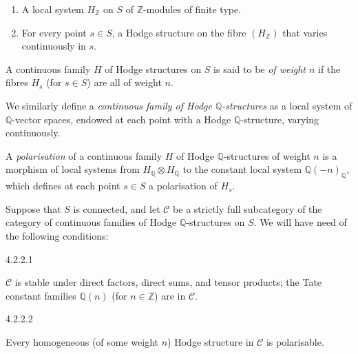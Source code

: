     
 \begin{enumerate}
      
 \item[(a)]
        A local system \(H_\mathbb {Z}\) on \(S\) of \(\mathbb {Z}\)-modules of finite type.
      

      
 \item[(b)]
        For every point \(s\in  S\), a Hodge structure on the fibre \((H_\mathbb {Z})\) that varies continuously in \(s\).
      

    \end{enumerate}\par{}A continuous family \(H\) of Hodge structures on \(S\) is said to be \emph{of weight \(n\)} if the fibres \(H_s\) (for \(s\in  S\)) are all of weight \(n\).\par{}We similarly define a \emph{continuous family of Hodge \(\mathbb {Q}\)-structures} as a local system of \(\mathbb {Q}\)-vector spaces, endowed at each point with a Hodge \(\mathbb {Q}\)-structure, varying continuously.\par{}A \emph{polarisation} of a continuous family \(H\) of Hodge \(\mathbb {Q}\)-structures of weight \(n\) is a morphism of local systems from \(H_\mathbb {Q}\otimes  H_\mathbb {Q}\) to the constant local system \(\mathbb {Q}(-n)_\mathbb {Q}\), which defines at each point \(s\in  S\) a polarisation of \(H_s\).\label{hodge-theory-ii-4.2.2}\par{}Suppose that \(S\) is connected, and let \(\mathcal {C}\) be a strictly full subcategory of the category of continuous families of Hodge \(\mathbb {Q}\)-structures on \(S\).
    We will have need of the following conditions:

    \begin{condition}{4.2.2.1}\label{hodge-theory-ii-4.2.2.1}\skipsinglepar\par{}\(\mathcal {C}\) is stable under direct factors, direct sums, and tensor products;
        the Tate constant families \(\mathbb {Q}(n)\) (for \(n\in \mathbb {Z}\)) are in \(\mathcal {C}\).\end{condition}

    \begin{condition}{4.2.2.2}\label{hodge-theory-ii-4.2.2.2}\skipsinglepar\par{}Every homogeneous (of some weight \(n\)) Hodge structure in \(\mathcal {C}\) is polarisable.\end{condition}

